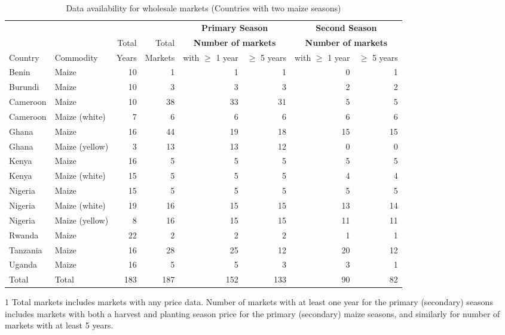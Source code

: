 \begin{table}[ht]
	\centering
	\begin{threeparttable}[t]
		\caption{Data availability for wholesale markets (Countries with two maize seasons)}
		\label{tab:avail_wholesale2}
		\begin{tabular}{|ll|rr|rr|rr|}
			\hline
			& &  &  & \multicolumn{2}{c}{\textbf{Primary Season}}  & \multicolumn{2}{c}{\textbf{Second Season}}\\ 
			&  & Total  & Total   & \multicolumn{2}{c}{\textbf{Number of markets}} & \multicolumn{2}{c}{\textbf{Number of markets}} \\ 
			Country & Commodity & Years & Markets & with $\geq$ 1 year & $\geq$ 5 years & with $\geq$ 1 year & $\geq$ 5 years\\ 
			\hline
Benin & Maize &  10 &   1 &   1 &   1 &   0 &   1 \\ 
  Burundi & Maize &  10 &   3 &   3 &   3 &   2 &   2 \\ 
  Cameroon & Maize &  10 &  38 &  33 &  31 &   5 &   5 \\ 
  Cameroon & Maize (white) &   7 &   6 &   6 &   6 &   6 &   6 \\ 
  Ghana & Maize &  16 &  44 &  19 &  18 &  15 &  15 \\ 
  Ghana & Maize (yellow) &   3 &  13 &  13 &  12 &   0 &   0 \\ 
  Kenya & Maize &  16 &   5 &   5 &   5 &   5 &   5 \\ 
  Kenya & Maize (white) &  15 &   5 &   5 &   5 &   4 &   4 \\ 
  Nigeria & Maize &  15 &   5 &   5 &   5 &   5 &   5 \\ 
  Nigeria & Maize (white) &  19 &  16 &  15 &  15 &  13 &  14 \\ 
  Nigeria & Maize (yellow) &   8 &  16 &  15 &  15 &  11 &  11 \\ 
  Rwanda & Maize &  22 &   2 &   2 &   2 &   1 &   1 \\ 
  Tanzania & Maize &  16 &  28 &  25 &  12 &  20 &  12 \\ 
  Uganda & Maize &  16 &   5 &   5 &   3 &   3 &   1 \\ 
  \hline
  Total & Total & 183 & 187 & 152 & 133 &  90 &  82 \\ 
   \hline
\end{tabular}
\begin{tablenotes}
\item [1] \footnotesize Total markets includes markets with any price data. Number of markets with at least one year for the primary (secondary) seasons includes markets with both a harvest and planting season price for the primary (secondary) maize seasons, and similarly for number of markets with at least 5 years. 
\end{tablenotes}
\end{threeparttable}
\end{table}
